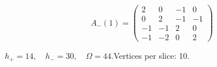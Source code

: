\begin{minipage}{\linewidth}
\begin{minipage}[c]{0.495\linewidth}
\end{minipage}%
\begin{minipage}[c]{0.495\linewidth}\centering\fontsize{9.7}{12}\selectfont
\setlength{\abovedisplayskip}{4pt}\setlength{\belowdisplayskip}{4pt}
\setlength{\abovedisplayshortskip}{4pt}\setlength{\belowdisplayshortskip}{4pt}
\setlength{\arraycolsep}{3pt}\renewcommand{\arraystretch}{1.08}
\[A_{-}(1)=\begin{pmatrix}2 & 0 & -1 & 0\\0 & 2 & -1 & -1\\-1 & -1 & 2 & 0\\-1 & -2 & 0 & 2\end{pmatrix}\]
\end{minipage}%
\par\smallskip\noindent\small $h_+=14,\quad h_-=30,\quad \Omega=44.$\quad Vertices per slice: 10.
\end{minipage}\par\vfill
